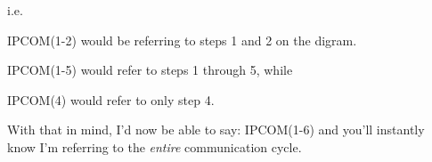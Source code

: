 i.\-e.


\begin{DoxyItemize}
\item I\-P\-C\-O\-M(1-\/2) would be referring to steps 1 and 2 on the digram.
\item I\-P\-C\-O\-M(1-\/5) would refer to steps 1 through 5, while
\item I\-P\-C\-O\-M(4) would refer to only step 4.
\end{DoxyItemize}

With that in mind, I'd now be able to say\-: I\-P\-C\-O\-M(1-\/6) and you'll instantly know I'm referring to the {\itshape entire} communication cycle.

 